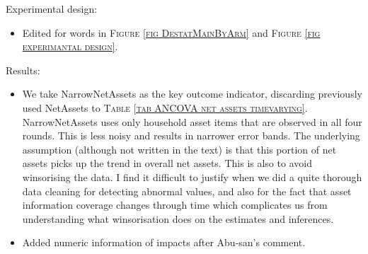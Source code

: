 Experimental design:
\begin{itemize}
\vspace{1.0ex}\setlength{\itemsep}{1.0ex}\setlength{\baselineskip}{12pt}
\item	Edited for words in \textsc{\normalsize Figure \ref{fig DestatMainByArm}} and \textsc{\normalsize Figure \ref{fig experimantal design}}. 
\end{itemize}
Results: 
\begin{itemize}
\vspace{1.0ex}\setlength{\itemsep}{1.0ex}\setlength{\baselineskip}{12pt}
\item	We take \textsf{NarrowNetAssets} as the key outcome indicator, discarding previously used \textsf{NetAssets} to \textsc{\normalsize Table \ref{tab ANCOVA net assets timevarying}}. \textsf{NarrowNetAssets} uses only household asset items that are observed in all four rounds. This is less noisy and results in narrower error bands. The underlying assumption (although not written in the text) is that this portion of net assets picks up the trend in overall net assets. This is also to avoid winsorising the data. I find it difficult to justify when we did a quite thorough data cleaning for detecting abnormal values, and also for the fact that asset information coverage changes through time which complicates us from understanding what winsorisation does on the estimates and inferences.
\item	Added numeric information of impacts after Abu-san's comment.
\end{itemize}
